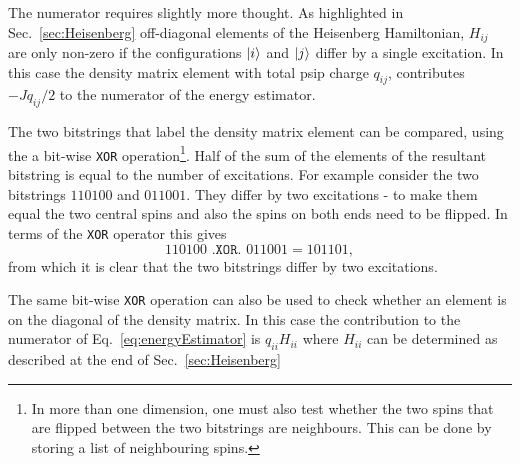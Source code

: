 The numerator requires slightly more thought. As highlighted in Sec.~\ref{sec:Heisenberg} off-diagonal elements of the Heisenberg Hamiltonian, $H_{ij}$ are only non-zero if the configurations $\ket{i}$ and $\ket{j}$ differ by a single excitation. In this case the density matrix element with total psip charge $q_{ij}$, contributes $-Jq_{ij}/2$ to the numerator of the energy estimator. 

The two bitstrings that label the density matrix element can be compared, using the a bit-wise \texttt{XOR} operation\footnote{In more than one dimension, one must also test whether the two spins that are flipped between the two bitstrings are neighbours. This can be done by storing a list of neighbouring spins.}. Half of the sum of the elements of the resultant bitstring is equal to the number of excitations. For example consider the two bitstrings $110100$ and $011001$. They differ by  two excitations - to make them equal the two central spins and also the spins on both ends need to be flipped. In terms of the \texttt{XOR} operator this gives 
\begin{equation}
110100 \texttt{ .XOR. } 011001 = 101101,
\end{equation}
from which it is clear that the two bitstrings differ by two excitations.

The same bit-wise \texttt{XOR} operation can also be used to check whether an element is on the diagonal of the density matrix. In this case the contribution to the numerator of Eq.~\ref{eq:energyEstimator} is $q_{ii} H_{ii}$ where $H_{ii}$ can be determined as described at the end of Sec.~\ref{sec:Heisenberg}


